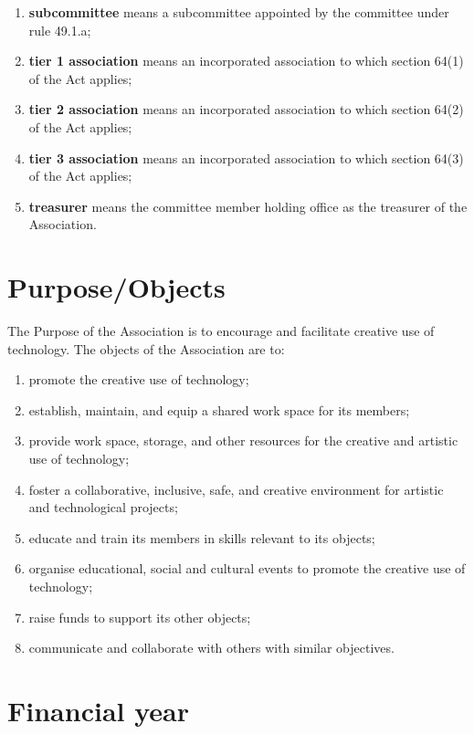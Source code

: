 \begin{enumerate}
\item \textbf{subcommittee} means a subcommittee appointed by the committee under rule 49.1.a;
\item \textbf{tier 1 association} means an incorporated association to which section 64(1) of the Act applies;
\item \textbf{tier 2 association} means an incorporated association to which section 64(2) of the Act applies;
\item \textbf{tier 3 association} means an incorporated association to which section 64(3) of the Act applies;
\item \textbf{treasurer} means the committee member holding office as the treasurer of the Association.
\end{enumerate}

\hypertarget{purposeobjects}{%
\section{Purpose/Objects}\label{purposeobjects}}

The Purpose of the Association is to encourage and facilitate creative use of technology. The objects of the Association are to:

\begin{enumerate}

\item promote the creative use of technology;
\item establish, maintain, and equip a shared work space for its members;
\item provide work space, storage, and other resources for the creative and artistic use of technology;
\item foster a collaborative, inclusive, safe, and creative environment for artistic and technological projects;
\item educate and train its members in skills relevant to its objects;
\item organise educational, social and cultural events to promote the creative use of technology;
\item raise funds to support its other objects;
\item communicate and collaborate with others with similar objectives.
\end{enumerate}

\hypertarget{financial-year}{%
\section{Financial year}\label{financial-year}}

